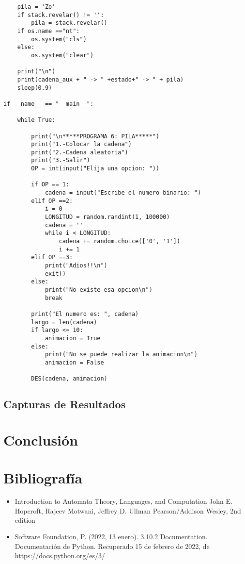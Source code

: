 \documentclass{article}
\begin{document}
\begin{lstlisting}
    pila = 'Zo'    
    if stack.revelar() != '':
        pila = stack.revelar()
    if os.name =="nt": 
        os.system("cls") 
    else: 
        os.system("clear")
        
    print("\n")
    print(cadena_aux + " -> " +estado+" -> " + pila)
    sleep(0.9)

if __name__ == "__main__":
    
    while True:
        
        print("\n*****PROGRAMA 6: PILA*****")
        print("1.-Colocar la cadena")
        print("2.-Cadena aleatoria")
        print("3.-Salir")
        OP = int(input("Elija una opcion: "))
            
        if OP == 1:
            cadena = input("Escribe el numero binario: ")
        elif OP ==2:
            i = 0
            LONGITUD = random.randint(1, 100000)
            cadena = ''
            while i < LONGITUD:
                cadena += random.choice(['0', '1'])
                i += 1   
        elif OP ==3:
            print("Adios!!\n")
            exit()
        else:
            print("No existe esa opcion\n")
            break
        
        print("El numero es: ", cadena)
        largo = len(cadena)
        if largo <= 10:
            animacion = True
        else:
            print("No se puede realizar la animacion\n")
            animacion = False
            
        DES(cadena, animacion)
\end{lstlisting}

\subsection{Capturas de Resultados}

\section{Conclusi\'on}

\section{Bibliograf\'ia}
\begin{itemize}
    \item Introduction to Automata Theory, Languages, and Computation
    John E. Hopcroft, Rajeev Motwani, Jeffrey D. Ullman
    Pearson/Addison Wesley, 2nd edition
    \item Software Foundation, P. (2022, 13 enero). 3.10.2 Documentation. Documentación de Python. Recuperado 15 de febrero de 2022, de https://docs.python.org/es/3/
\end{itemize}
\end{document}
